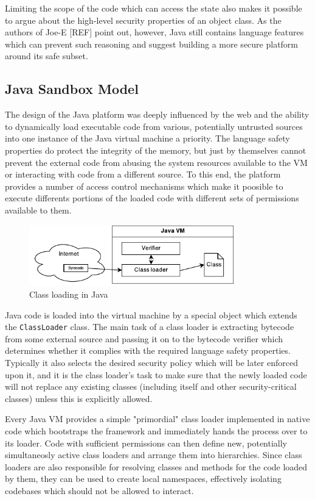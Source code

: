 \documentclass[a4paper,12pt,twoside,openright]{report}
\begin{document}
Limiting the scope of the code which can access the state also makes it possible to argue about the high-level security properties of an object class. As the authors of Joe-E [REF] point out, however, Java still contains language features which can prevent such reasoning and suggest building a more secure platform around its safe subset.

\subsection{Java Sandbox Model}

The design of the Java platform was deeply influenced by the web and the ability to dynamically load executable code from various, potentially untrusted sources into one instance of the Java virtual machine a priority. The language safety properties do protect the integrity of the memory, but just by themselves cannot prevent the external code from abusing the system resources available to the VM or interacting with code from a different source. To this end, the platform provides a number of access control mechanisms which make it poosible to execute differents portions of the loaded code with different sets of permissions available to them. 

\begin{figure}
	\centering
	\includegraphics[width=0.8\textwidth]{dia_java_classload.pdf}
	\caption{Class loading in Java}
\end{figure}

Java code is loaded into the virtual machine by a special object which extends the \texttt{ClassLoader} class. The main task of a class loader is extracting bytecode from some external source and passing it on to the bytecode verifier which determines whether it complies with the required language safety properties. Typically it also selects the desired security policy which will be later enforced upon it, and it is the class loader's task to make sure that the newly loaded code will not replace any existing classes (including itself and other security-critical classes) unless this is explicitly allowed. 

Every Java VM provides a simple "primordial" class loader implemented in native code which bootstraps the framework and immediately hands the process over to its loader. Code with sufficient permissions can then define new, potentially simultaneosly active class loaders and arrange them into hierarchies. Since class loaders are also responsible for resolving classes and methods for the code loaded by them, they can be used to create local namespaces, effectively isolating codebases which should not be allowed to interact.
\end{document}
